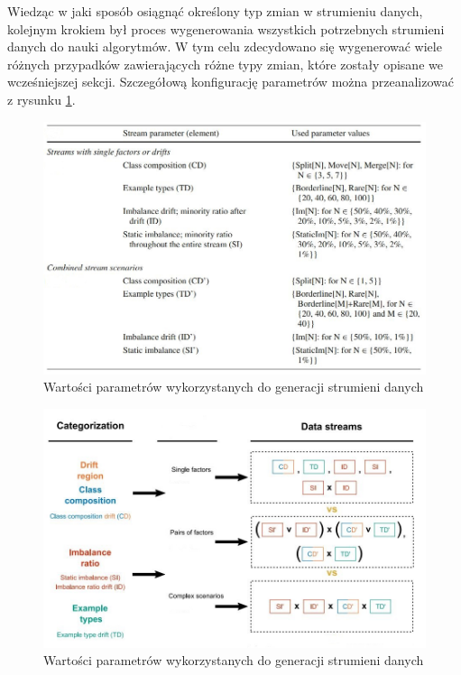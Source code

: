 \noindent Wiedząc w jaki sposób osiągnąć określony typ zmian w strumieniu danych, kolejnym krokiem był proces wygenerowania wszystkich potrzebnych strumieni danych do nauki algorytmów. W tym celu zdecydowano się wygenerować wiele różnych przypadków zawierających różne typy zmian, które zostały opisane we wcześniejszej sekcji. Szczegółową konfigurację parametrów można przeanalizować z rysunku \ref{Figure:DriftParameters}.

\begin{figure}[h] 
    \centering
    \includegraphics[width=15cm]{figures/drift_parameters.JPG}
    \caption{Wartości parametrów wykorzystanych do generacji strumieni danych \cite{Article:TypyPrzykladow}}\label{Figure:DriftParameters}
\end{figure}

\begin{figure}[h] 
    \centering
    \includegraphics[width=13cm]{figures/drift_categorization.JPG}
    \caption{Wartości parametrów wykorzystanych do generacji strumieni danych \cite{Article:TypyPrzykladow}}\label{Figure:DriftCategorization}
\end{figure}


